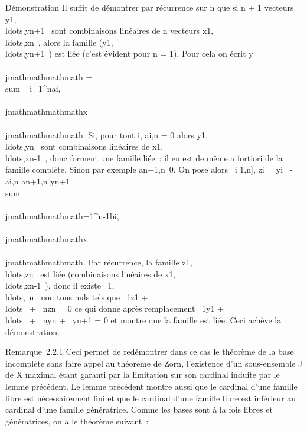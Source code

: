 Démonstration Il suffit de démontrer par récurrence sur n que si n + 1
vecteurs
y1,\\ldots,yn+1~
sont combinaisons linéaires de n vecteurs
x1,\\ldots,xn~,
alors la famille
(y1,\\ldots,yn+1~)
est liée (c'est évident pour n = 1). Pour cela on écrit y\\\\jmathmathmathmath
= \\sum ~
i=1^nai,\\\\jmathmathmathmathx\\\\jmathmathmathmath. Si, pour tout i,
ai,n = 0 alors
y1,\\ldots,yn~
sont combinaisons linéaires de
x1,\\ldots,xn-1~,
donc forment une famille liée~; il en est de même a fortiori de la
famille complète. Sinon par exemple
an+1,n\neq~0. On pose alors
\forall~i \in {[}1,n{]}, zi = yi~
- ai,n \over an+1,n
yn+1 =\ \\sum
 \\\\jmathmathmathmath=1^n-1bi,\\\\jmathmathmathmathx\\\\jmathmathmathmath. Par récurrence,
la famille
z1,\\ldots,zn~
est liée (combinaisons linéaires de
x1,\\ldots,xn-1~),
donc il existe
\alpha~1,\\ldots,\alpha~n~
non tous nuls tels que \alpha~1z1 +
\\ldots~ +
\alpha~nzn = 0 ce qui donne après remplacement
\alpha~1y1 +
\\ldots~ +
\alpha~nyn + \beta~yn+1 = 0 et montre que la famille
est liée. Ceci achève la démonstration.

Remarque~2.2.1 Ceci permet de redémontrer dans ce cas le théorème de la
base incomplète sans faire appel au théorème de Zorn, l'existence d'un
sous-ensemble J de X maximal étant garanti par la limitation sur son
cardinal induite par le lemme précédent. Le lemme précédent montre aussi
que le cardinal d'une famille libre est nécessairement fini et que le
cardinal d'une famille libre est inférieur au cardinal d'une famille
génératrice. Comme les bases sont à la fois libres et génératrices, on a
le théorème suivant~:

